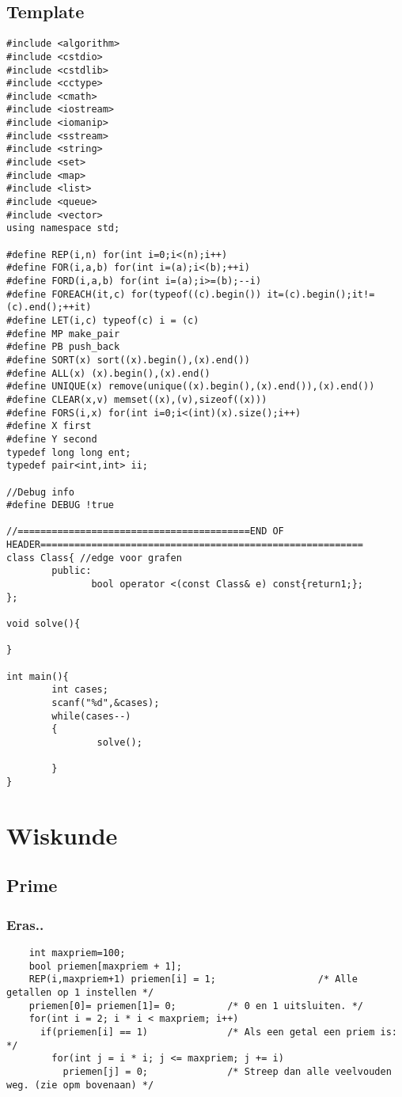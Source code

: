 \documentclass[a4paper,10pt,oneside]{report}
\begin{document}
\section{Template}
\begin{verbatim}
#include <algorithm>
#include <cstdio>
#include <cstdlib>
#include <cctype>
#include <cmath>
#include <iostream>
#include <iomanip>
#include <sstream>
#include <string>
#include <set>
#include <map>
#include <list>
#include <queue>
#include <vector>
using namespace std;

#define REP(i,n) for(int i=0;i<(n);i++)
#define FOR(i,a,b) for(int i=(a);i<(b);++i)
#define FORD(i,a,b) for(int i=(a);i>=(b);--i)
#define FOREACH(it,c) for(typeof((c).begin()) it=(c).begin();it!=(c).end();++it)
#define LET(i,c) typeof(c) i = (c)
#define MP make_pair
#define PB push_back
#define SORT(x) sort((x).begin(),(x).end())
#define ALL(x) (x).begin(),(x).end()
#define UNIQUE(x) remove(unique((x).begin(),(x).end()),(x).end())
#define CLEAR(x,v) memset((x),(v),sizeof((x)))
#define FORS(i,x) for(int i=0;i<(int)(x).size();i++)
#define X first
#define Y second
typedef long long ent;
typedef pair<int,int> ii;

//Debug info
#define DEBUG !true

//=========================================END OF HEADER=========================================================
class Class{ //edge voor grafen
        public:
               bool operator <(const Class& e) const{return1;};
};

void solve(){
	
}

int main(){
        int cases;
        scanf("%d",&cases);
        while(cases--)
        { 
                solve();

        }
} 
\end{verbatim}
\chapter{Wiskunde}
\section{Prime}
\subsection{Eras..}
\begin{verbatim}
    int maxpriem=100;
    bool priemen[maxpriem + 1];
    REP(i,maxpriem+1) priemen[i] = 1;                  /* Alle getallen op 1 instellen */
    priemen[0]= priemen[1]= 0;         /* 0 en 1 uitsluiten. */
    for(int i = 2; i * i < maxpriem; i++)
      if(priemen[i] == 1)              /* Als een getal een priem is: */
        for(int j = i * i; j <= maxpriem; j += i) 
          priemen[j] = 0;              /* Streep dan alle veelvouden weg. (zie opm bovenaan) */
\end{verbatim}
\end{document}
